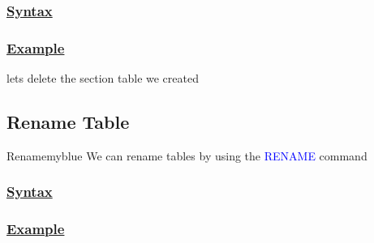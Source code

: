 \subsubsection*{\underline{Syntax}}



\subsubsection*{\underline{Example}}
lets delete the section table we created 



\subsection{Rename Table}

\begin{prettyBox}{Rename}{myblue}
    We can rename tables by using the \textcolor{blue}{RENAME} command 
\end{prettyBox}

\subsubsection*{\underline{Syntax}}



\subsubsection*{\underline{Example}}



